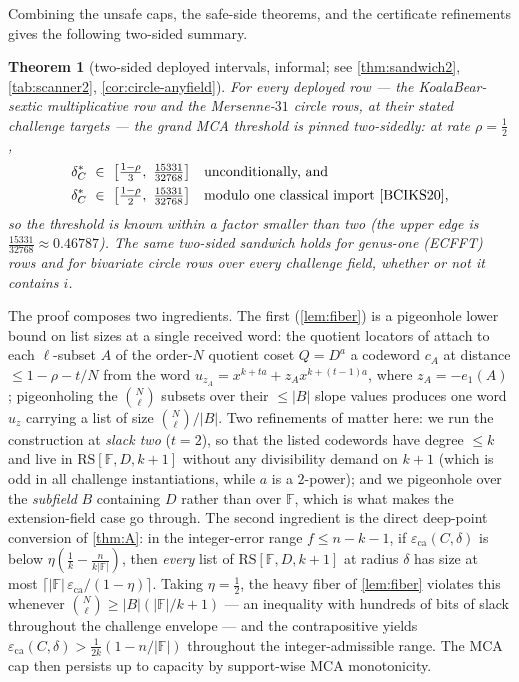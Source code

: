 \documentclass[11pt]{article}
\newtheorem{theorem}{Theorem}[section]
\theoremstyle{definition}
\theoremstyle{remark}
\newcommand{\F}{\mathbb{F}}
\newcommand{\B}{B}
\newcommand{\RS}{\mathrm{RS}}
\newcommand{\eca}{\varepsilon_{\mathrm{ca}}}
\newcommand{\eone}{e_1}
\begin{document}
Combining the unsafe caps, the safe-side theorems, and the certificate refinements gives the following two-sided summary.

\begin{theorem}[two-sided deployed intervals, informal; see \cref{thm:sandwich2}, \cref{tab:scanner2}, \cref{cor:circle-anyfield}]\label{thm:informal-sandwich}
For every deployed row --- the KoalaBear-sextic multiplicative row and the Mersenne-$31$ circle rows, at their stated challenge targets --- the grand MCA threshold is pinned two-sidedly: at rate $\rho=\tfrac12$,
\begin{align*}
\delta^*_C\ &\in\ \bigl[\tfrac{1-\rho}3,\ \tfrac{15331}{32768}\bigr] &&\text{unconditionally, and}\\
\delta^*_C\ &\in\ \bigl[\tfrac{1-\rho}2,\ \tfrac{15331}{32768}\bigr] &&\text{modulo one classical import \cite{BCIKS20},}
\end{align*}
so the threshold is known within a factor smaller than two \textup(the upper edge is $\tfrac{15331}{32768}\approx0.46787$\textup). The same two-sided sandwich holds for genus-one \textup(ECFFT\textup) rows and for bivariate circle rows over every challenge field, whether or not it contains $i$.
\end{theorem}

The proof composes two ingredients. The first (\cref{lem:fiber}) is a pigeonhole lower bound on list sizes at a single received word: the quotient locators of \cite{Cho26a} attach to each $\ell$-subset $A$ of the order-$N$ quotient coset $Q=D^{a}$ a codeword $c_A$ at distance $\le1-\rho-t/N$ from the word $u_{z_A}=x^{k+ta}+z_Ax^{k+(t-1)a}$, where $z_A=-\eone(A)$; pigeonholing the $\binom N\ell$ subsets over their $\le|\B|$ slope values produces one word $u_z$ carrying a list of size $\binom N\ell/|\B|$. Two refinements of \cite[Main Thm.\,(d)]{Cho26a} matter here: we run the construction at \emph{slack two} ($t=2$), so that the listed codewords have degree $\le k$ and live in $\RS[\F,D,k+1]$ without any divisibility demand on $k+1$ (which is odd in all challenge instantiations, while $a$ is a $2$-power); and we pigeonhole over the \emph{subfield} $\B$ containing $D$ rather than over $\F$, which is what makes the extension-field case go through. The second ingredient is the direct deep-point conversion of \cref{thm:A}: in the integer-error range $f\le n-k-1$, if $\eca(C,\delta)$ is below $\eta(\frac1k-\frac n{k|\F|})$, then \emph{every} list of $\RS[\F,D,k+1]$ at radius $\delta$ has size at most $\lceil|\F|\,\eca/(1-\eta)\rceil$. Taking $\eta=\frac12$, the heavy fiber of \cref{lem:fiber} violates this whenever $\binom N\ell\ge|\B|(|\F|/k+1)$ --- an inequality with hundreds of bits of slack throughout the challenge envelope --- and the contrapositive yields $\eca(C,\delta)>\frac1{2k}(1-n/|\F|)$ throughout the integer-admissible range. The MCA cap then persists up to capacity by support-wise MCA monotonicity.
\end{document}
